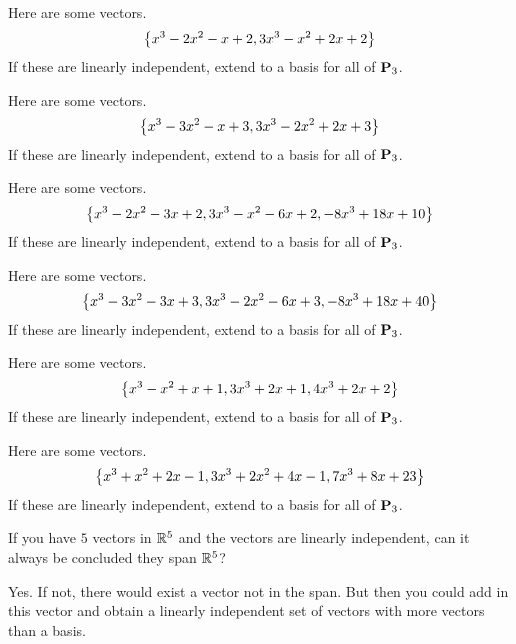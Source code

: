 \begin{ex}
  Here are some vectors.
  \begin{equation*}
    \left\{x^{3}-2x^{2}-x+2,3x^{3}-x^{2}+2x+2\right\}
  \end{equation*}
  If these are linearly independent, extend to a basis for all of
  $\mathbf{P}_{3}$.
\end{ex}

\begin{ex}
  Here are some vectors.
  \begin{equation*}
    \left\{x^{3}-3x^{2}-x+3,3x^{3}-2x^{2}+2x+3\right\}
  \end{equation*}
  If these are linearly independent, extend to a basis for all of
  $\mathbf{P}_{3}$.
\end{ex}

\begin{ex}
  Here are some vectors.
  \begin{equation*}
    \left\{x^{3}-2x^{2}-3x+2,3x^{3}-x^{2}-6x+2,-8x^{3}+18x+10\right\}
  \end{equation*}
  If these are linearly independent, extend to a basis for all of
  $\mathbf{P}_{3}$.
\end{ex}

\begin{ex}
  Here are some vectors.
  \begin{equation*}
    \left\{x^{3}-3x^{2}-3x+3,3x^{3}-2x^{2}-6x+3,-8x^{3}+18x+40\right\}
  \end{equation*}
  If these are linearly independent, extend to a basis for all of
  $\mathbf{P}_{3}$.
\end{ex}

\begin{ex}
  Here are some vectors.
  \begin{equation*}
    \left\{x^{3}-x^{2}+x+1,3x^{3}+2x+1,4x^{3}+2x+2\right\}
  \end{equation*}
  If these are linearly independent, extend to a basis for all of
  $\mathbf{P}_{3}$.
\end{ex}

\begin{ex}
  Here are some vectors.
  \begin{equation*}
    \left\{x^{3}+x^{2}+2x-1,3x^{3}+2x^{2}+4x-1,7x^{3}+8x+23\right\}
  \end{equation*}
  If these are linearly independent, extend to a basis for all of
  $\mathbf{P}_{3}$.
\end{ex}

\begin{ex}
  If you have $5$ vectors in $\mathbb{R}^{5}$ and the vectors are linearly
  independent, can it always be concluded they span $\mathbb{R}^{5}$?
  \begin{sol}
    Yes. If not, there would exist a vector not in the span. But then
    you could add in this vector and obtain a linearly independent set
    of vectors with more vectors than a basis.
  \end{sol}
\end{ex}

